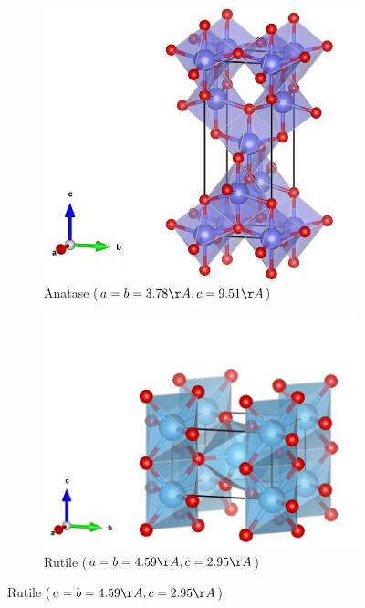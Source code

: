 \documentclass[main.tex]{subfiles}
\begin{document}
\begin{figure}[!htb]
\centering
	\begin{subfigure}[h]{0.6\textwidth}
		\centering
		\includegraphics[width=\linewidth]{anatase}
  		\caption{Anatase ($a=b=3.78 \AA, c=9.51 \AA$)}
	\end{subfigure}
	\begin{subfigure}[h]{0.6\textwidth}
		\centering
		\includegraphics[width=\linewidth]{rutile}
  		\caption{Rutile ($a=b=4.59 \AA, c=2.95 \AA$)}
	\end{subfigure}

\end{figure}
\end{document}

